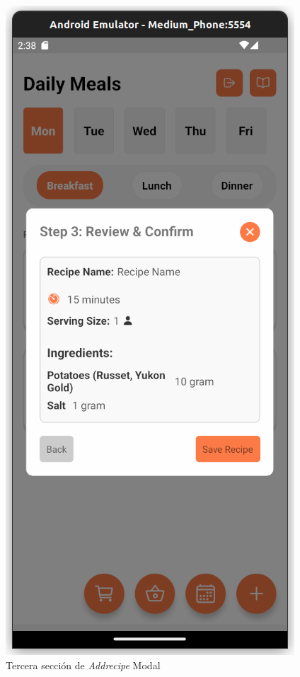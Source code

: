 \documentclass[twoside, openright, 11pt]{report}
\begin{document}
					\begin{figure}[H]
						\centering
						\includegraphics{imagenes/AddRecipeModalTerceraParte}
						\caption{Tercera sección de \textit{Addrecipe} Modal}
						\label{fig:AddRecipeModalTerceraParte}
					\end{figure}
\end{document}
